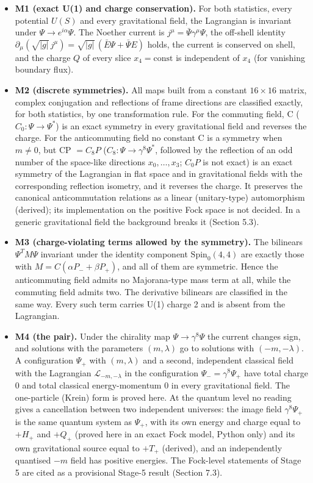 \documentclass[11pt]{article}
\begin{document}
\begin{itemize}
\item \textbf{M1 (exact U(1) and charge conservation).} For both statistics, every potential $U(S)$ and every gravitational field, the Lagrangian is invariant under $\Psi\to e^{i\alpha}\Psi$. The Noether current is $j^\mu=\bar\Psi\gamma^\mu\Psi$, the off-shell identity $\partial_\mu(\sqrt{|g|}\,j^\mu)=\sqrt{|g|}\,(\bar E\Psi+\bar\Psi E)$ holds, the current is conserved on shell, and the charge $Q$ of every slice $x_4=\text{const}$ is independent of $x_4$ (for vanishing boundary flux).
\item \textbf{M2 (discrete symmetries).} All maps built from a constant $16\times16$ matrix, complex conjugation and reflections of frame directions are classified exactly, for both statistics, by one transformation rule. For the commuting field, C ($C_0:\Psi\to\Psi^\ast$) is an exact symmetry in every gravitational field and reverses the charge. For the anticommuting field no constant C is a symmetry when $m\ne0$, but CP $=C_8P$ ($C_8:\Psi\to\gamma^8\Psi^\ast$, followed by the reflection of an odd number of the space-like directions $x_0,\dots,x_3$; $C_0P$ is not exact) is an exact symmetry of the Lagrangian in flat space and in gravitational fields with the corresponding reflection isometry, and it reverses the charge. It preserves the canonical anticommutation relations as a linear (unitary-type) automorphism (derived); its implementation on the positive Fock space is not decided. In a generic gravitational field the background breaks it (Section 5.3).
\item \textbf{M3 (charge-violating terms allowed by the symmetry).} The bilinears $\Psi^TM\Psi$ invariant under the identity component $\mathrm{Spin}_0(4,4)$ are exactly those with $M=C(\alpha P_-+\beta P_+)$, and all of them are symmetric. Hence the anticommuting field admits no Majorana-type mass term at all, while the commuting field admits two. The derivative bilinears are classified in the same way. Every such term carries U(1) charge 2 and is absent from the Lagrangian.
\item \textbf{M4 (the pair).} Under the chirality map $\Psi\to\gamma^8\Psi$ the current changes sign, and solutions with the parameters $(m,\lambda)$ go to solutions with $(-m,-\lambda)$. A configuration $\Psi_+$ with $(m,\lambda)$ and a second, independent classical field with the Lagrangian $\mathcal L_{-m,-\lambda}$ in the configuration $\Psi_-=\gamma^8\Psi_+$ have total charge 0 and total classical energy-momentum 0 in every gravitational field. The one-particle (Krein) form is proved here. At the quantum level no reading gives a cancellation between two independent universes: the image field $\gamma^8\Psi_+$ is the same quantum system as $\Psi_+$, with its own energy and charge equal to $+H_+$ and $+Q_+$ (proved here in an exact Fock model, Python only) and its own gravitational source equal to $+T_+$ (derived), and an independently quantised $-m$ field has positive energies. The Fock-level statements of Stage 5 are cited as a provisional Stage-5 result (Section 7.3).

\end{itemize}
\end{document}
